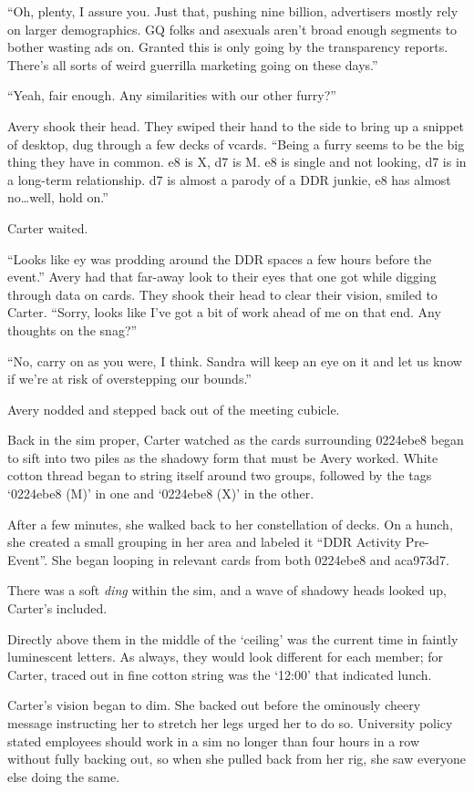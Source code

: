 ``Oh, plenty, I assure you. Just that, pushing nine billion, advertisers mostly rely on larger demographics. GQ folks and asexuals aren't broad enough segments to bother wasting ads on. Granted this is only going by the transparency reports. There's all sorts of weird guerrilla marketing going on these days.''

``Yeah, fair enough. Any similarities with our other furry?''

Avery shook their head. They swiped their hand to the side to bring up a snippet of desktop, dug through a few decks of vcards. ``Being a furry seems to be the big thing they have in common. e8 is X, d7 is M. e8 is single and not looking, d7 is in a long-term relationship. d7 is almost a parody of a DDR junkie, e8 has almost no\ldots{}well, hold on.''

Carter waited.

``Looks like ey was prodding around the DDR spaces a few hours before the event.'' Avery had that far-away look to their eyes that one got while digging through data on cards. They shook their head to clear their vision, smiled to Carter. ``Sorry, looks like I've got a bit of work ahead of me on that end. Any thoughts on the snag?''

``No, carry on as you were, I think. Sandra will keep an eye on it and let us know if we're at risk of overstepping our bounds.''

Avery nodded and stepped back out of the meeting cubicle.

Back in the sim proper, Carter watched as the cards surrounding 0224ebe8 began to sift into two piles as the shadowy form that must be Avery worked. White cotton thread began to string itself around two groups, followed by the tags `0224ebe8 (M)' in one and `0224ebe8 (X)' in the other.

After a few minutes, she walked back to her constellation of decks. On a hunch, she created a small grouping in her area and labeled it ``DDR Activity Pre-Event''. She began looping in relevant cards from both 0224ebe8 and aca973d7.

There was a soft \emph{ding} within the sim, and a wave of shadowy heads looked up, Carter's included.

Directly above them in the middle of the `ceiling' was the current time in faintly luminescent letters. As always, they would look different for each member; for Carter, traced out in fine cotton string was the `12:00' that indicated lunch.

Carter's vision began to dim. She backed out before the ominously cheery message instructing her to stretch her legs urged her to do so. University policy stated employees should work in a sim no longer than four hours in a row without fully backing out, so when she pulled back from her rig, she saw everyone else doing the same.

